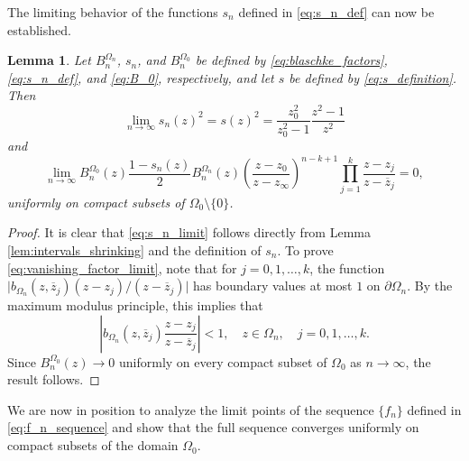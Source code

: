 \documentclass[12pt,oneside,reqno]{amsart}
\newtheorem{lemma}[theorem]{Lemma}
\theoremstyle{definition}
\numberwithin{equation}{section}
\begin{document}
The limiting behavior of the functions $s_n$ defined in \eqref{eq:s_n_def} can now be established. 
\begin{lemma}
	\label{lem:limiting_behaviours}
	Let $B_n^{\Omega_n}$, $s_n$, and $B_n^{\Omega_0}$ be defined by \eqref{eq:blaschke_factors}, \eqref{eq:s_n_def}, and \eqref{eq:B_0}, respectively, and let $s$ be defined by \eqref{eq:s_definition}. Then
	\begin{equation}
		\lim_{n\rightarrow\infty}s_n(z)^2 = s(z)^2=\frac{z_0^2}{z_0^2-1}\frac{z^2-1}{z^2}
		\label{eq:s_n_limit}
	\end{equation}
	and
	\begin{equation}
		\lim_{n\rightarrow \infty}B_n^{\Omega_0}(z)\frac{1-s_n(z)}{2}B_n^{\Omega_n}(z)\left(\frac{z-z_0}{z-z_\infty}\right)^{n-k+1}\prod_{j=1}^{k}\frac{z-z_j}{z-\overline{z}_j}=0,\label{eq:vanishing_factor_limit}
	\end{equation}
	uniformly on compact subsets of $\Omega_0\setminus\{0\}$.
\end{lemma}
\begin{proof}
	It is clear that \eqref{eq:s_n_limit} follows directly from Lemma \ref{lem:intervals_shrinking} and the definition of $s_n$.
	To prove \eqref{eq:vanishing_factor_limit}, note that for $j=0,1,\dotsc,k$, the function 
	$\vert b_{\Omega_n}(z,\overline{z}_j){(z-z_j)}/{(z-\overline{z}_j)}\vert$ has boundary values at most $1$ 
	on $\partial\Omega_n$. By the maximum modulus principle, this implies that
	\[\left|b_{\Omega_n}(z,\overline{z}_j)\frac{z-z_j}{z-\overline{z}_j}\right| < 1,
	   \quad z\in \Omega_n, \quad j=0,1,\dotsc, k.\] 
Since $B_n^{\Omega_0}(z)\to 0$ uniformly on every compact subset of $\Omega_0$ as $n\to\infty$, the result follows.
\end{proof}

We are now in position to analyze the limit points of the sequence $\{f_n\}$ defined in \eqref{eq:f_n_sequence} and show that the full sequence converges uniformly on compact subsets of the domain $\Omega_0$.
\end{document}

